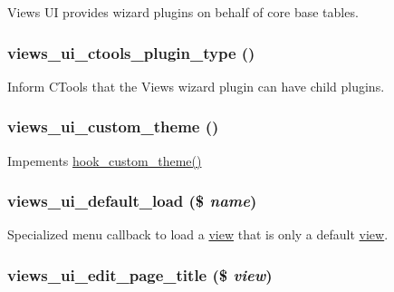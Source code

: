 Views UI provides wizard plugins on behalf of core base tables. \hypertarget{views__ui_8module_ae2a131b1e4c36d0e2777642eda6d78b0}{
\subsubsection[{views\_\-ui\_\-ctools\_\-plugin\_\-type}]{\setlength{\rightskip}{0pt plus 5cm}views\_\-ui\_\-ctools\_\-plugin\_\-type ()}}
\label{views__ui_8module_ae2a131b1e4c36d0e2777642eda6d78b0}
Inform CTools that the Views wizard plugin can have child plugins. \hypertarget{views__ui_8module_a9b0eb98e71715cf1d082f0b0c3f1121e}{
\subsubsection[{views\_\-ui\_\-custom\_\-theme}]{\setlength{\rightskip}{0pt plus 5cm}views\_\-ui\_\-custom\_\-theme ()}}
\label{views__ui_8module_a9b0eb98e71715cf1d082f0b0c3f1121e}
Impements \hyperlink{group__hooks_gab83dce4ef80bc5005ee0de98fc005b1f}{hook\_\-custom\_\-theme()} \hypertarget{views__ui_8module_a5457ed35c0e4b1764846ba4a0b74224f}{
\subsubsection[{views\_\-ui\_\-default\_\-load}]{\setlength{\rightskip}{0pt plus 5cm}views\_\-ui\_\-default\_\-load (\$ {\em name})}}
\label{views__ui_8module_a5457ed35c0e4b1764846ba4a0b74224f}
Specialized menu callback to load a \hyperlink{classview}{view} that is only a default \hyperlink{classview}{view}. \hypertarget{views__ui_8module_aac98d6c71b5ab337edf517fc59f2cddf}{
\subsubsection[{views\_\-ui\_\-edit\_\-page\_\-title}]{\setlength{\rightskip}{0pt plus 5cm}views\_\-ui\_\-edit\_\-page\_\-title (\$ {\em view})}}
